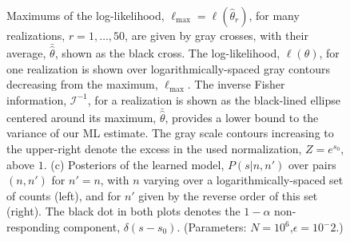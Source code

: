 \documentclass[letterpaper,english,prl,reprint,longbibliography]{revtex4-1} %
\begin{document}
\begin{figure}[tbph!]
{Maximums of the log-likelihood, $\ell_\textrm{max}=\ell(\hat{\theta}_r)$, for many realizations, $r=1,\dots,50$, are given by gray crosses, with their average, $\bar{\hat{\theta}}$, shown as the black cross. 
The log-likelihood, $\ell(\theta)$, for one realization is shown over logarithmically-spaced gray contours decreasing from the maximum, $\ell_{\textrm{max}}$. 
The inverse Fisher information, $\mathcal{I}^{-1}$, for a realization is shown as the black-lined ellipse centered around its maximum, $\bar{\hat{\theta}}$, provides a lower bound to the variance of our ML estimate. 
The gray scale contours increasing to the upper-right denote the excess in the used normalization, $Z=e^{s_0}$, above $1$. (c) Posteriors of the learned model, $P(s|n,n')$ over pairs $(n,n')$ for $n'=n$, with $n$ varying over a logarithmically-spaced set of counts (left), and for $n'$ given by the reverse order of this set (right). The black dot in both plots denotes the $1-\alpha$ non-responding component, $\delta(s-s_0)$.
(Parameters: $N=10^6$,$\epsilon=10^-2$.)
\label{fig:diffexpr_ex1}}
\end{figure}
\end{document}
